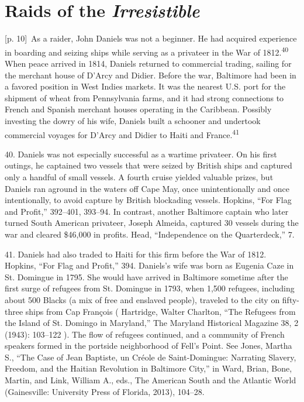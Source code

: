 \documentclass[10pt,a4paper]{article}
\begin{document}
\section*{Raids of the \textit{Irresistible}}
{\scriptsize\color{gray} [p. 10]}\ As a raider, John Daniels was not a beginner. He had acquired experience in boarding and seizing ships while serving as a privateer in the War of 1812.\nobreak\textsuperscript{40} When peace arrived in 1814, Daniels returned to commercial trading, sailing for the merchant house of D’Arcy and Didier. Before the war, Baltimore had been in a favored position in West Indies markets. It was the nearest U.S. port for the shipment of wheat from Pennsylvania farms, and it had strong connections to French and Spanish merchant houses operating in the Caribbean. Possibly investing the dowry of his wife, Daniels built a schooner and undertook commercial voyages for D’Arcy and Didier to Haiti and France.\nobreak\textsuperscript{41}\par{\small 40. Daniels was not especially successful as a wartime privateer. On his first outings, he captained two vessels that were seized by British ships and captured only a handful of small vessels. A fourth cruise yielded valuable prizes, but Daniels ran aground in the waters off Cape May, once unintentionally and once intentionally, to avoid capture by British blockading vessels. Hopkins, “For Flag and Profit,” 392–401, 393–94. In contrast, another Baltimore captain who later turned South American privateer, Joseph Almeida, captured 30 vessels during the war and cleared \$46,000 in profits. Head, “Independence on the Quarterdeck,” 7.\par}{\small 41. Daniels had also traded to Haiti for this firm before the War of 1812. Hopkins, “For Flag and Profit,” 394. Daniels’s wife was born as Eugenia Caze in St. Domingue in 1795. She would have arrived in Baltimore sometime after the first surge of refugees from St. Domingue in 1793, when 1,500 refugees, including about 500 Blacks (a mix of free and enslaved people), traveled to the city on fifty-three ships from Cap François ( Hartridge, Walter Charlton, “The Refugees from the Island of St. Domingo in Maryland,” The Maryland Historical Magazine 38, 2 (1943): 103–122 ). The flow of refugees continued, and a community of French speakers formed in the portside neighborhood of Fell’s Point. See Jones, Martha S., “The Case of Jean Baptiste, un Créole de Saint-Domingue: Narrating Slavery, Freedom, and the Haitian Revolution in Baltimore City,” in Ward, Brian, Bone, Martin, and Link, William A., eds., The American South and the Atlantic World (Gainesville: University Press of Florida, 2013), 104–28.\par}
\end{document}
